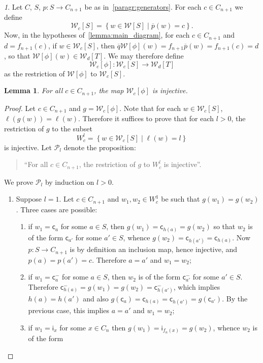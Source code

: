 \documentclass[reqno]{amsart}
\theoremstyle{plain}
\newtheorem{lemma}[subsubsection]{Lemma}
\theoremstyle{definition}
\theoremstyle{remark}
\newtheorem{paragr}[subsubsection]{} %
\newcommand{\setof}[2]{\left\{ #1\; | \; #2\right\}}
\newcommand{\WW}{\mathcal{W}}
\newcommand{\wtx}[1]{\WW[#1]} %
\newcommand{\wtxr}[2]{\WW_{#1}[#2]} %
\newcommand{\formal}[1]{\mathsf{#1}} %
\newcommand{\fcst}[1]{\formal{c}_{#1}} %
\newcommand{\finv}[1]{\formal{c}^{\boldsymbol{-}}_{#1}}%
\newcommand{\fid}[1]{\formal{i}_{#1}} %
\newcommand{\lgh}{\ell}%
\newcommand{\extend}[1]{\overline{#1}} %
\begin{document}
\begin{paragr}\label{paragr:restricted_formulas}
  Let $C$, $S$, $p:S\to C_{n+1}$ be as in~\ref{paragr:generators}. For
  each $c\in C_{n+1}$ we define
  \[\wtxr cS=\setof{w\in\wtx S}{\extend p(w)=c}.\]
  Now, in the hypotheses of~\cref{lemma:main_diagram}, for each $c\in
  C_{n+1}$ and $d=f_{n+1}(c)$, if $w\in\wtxr cS$, then $\extend
  q\wtx\phi(w)=f_{n+1}\extend p(w)=f_{n+1}(c)=d$, so that
  $\wtx\phi(w)\in\wtxr dT$. We may therefore define
  \[\wtxr c\phi:\wtxr cS\to \wtxr dT\]
  as the restriction of $\wtx\phi$ to $\wtxr cS$. 
\end{paragr}
\begin{lemma}\label{lemma:injectivity}
  For all $c\in C_{n+1}$, the map
  $\wtxr c\phi$ is injective.
\end{lemma}
\begin{proof}
  Let $c\in C_{n+1}$ and $g=\wtxr c\phi$. Note that for each $w\in\wtxr
  cS$, $\lgh(g(w))=\lgh(w)$. Therefore it suffices to prove that for
  each $l>0$, the restriction of $g$ to the subset
  \[W^l_c=\setof{w\in\wtxr cS}{\lgh(w)=l}\]
  is injective. Let $\mathcal{P}_l$ denote the proposition:
  \begin{quote}
   ``For all $c\in C_{n+1}$, the restriction of $g$ to
    $W^l_c$ is injective''.
  \end{quote}
  We prove $\mathcal{P}_l$ by induction on $l>0$.
  \begin{enumerate}
  \item Suppose $l=1$. Let $c\in C_{n+1}$ and $w_1,w_2\in W^1_c$ be such that
    $g(w_1)=g(w_2)$. Three cases are possible:
    \begin{enumerate}
    \item if $w_1=\fcst a$ for some $a\in S$, then
      $g(w_1)=\fcst{h(a)}=g(w_2)$ so that $w_2$ is of the form
      $\fcst{a'}$ for some $a'\in S$, whence
      $g(w_2)=\fcst{h(a')}=\fcst{h(a)}$. Now $p:S\to C_{n+1}$ is by
      definition an inclusion map, hence injective, and
      $p(a)=p(a')=c$. Therefore $a=a'$ and $w_1=w_2$;
    \item if $w_1=\finv{a}$ for some $a\in S$, then $w_2$ is of the
      form $\finv{a'}$ for some $a'\in S$. Therefore
      $\finv{h(a)}=g(w_1)=g(w_2)=\finv{h(a')}$, which implies
      $h(a)=h(a')$ and also
      $g(\fcst{a})=\fcst{h(a)}=\fcst{h(a')}=g(\fcst{a'})$. By the
      previous case, this implies $a=a'$ and $w_1=w_2$;
      \item if $w_1=\fid x$ for some $x\in C_n$ then
      $g(w_1)=\fid{f_n(x)}=g(w_2)$, whence $w_2$ is of the form

\end{enumerate}
\end{enumerate}
\end{proof}
\end{document}
